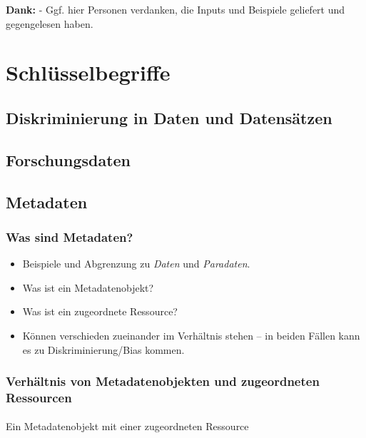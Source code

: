 \documentclass[
  letterpaper,
  DIV=11,
  numbers=noendperiod]{scrartcl}
\makeatletter
\let\oldparagraph\paragraph
\renewcommand{\paragraph}{
    \@ifstar
      \xxxParagraphStar
      \xxxParagraphNoStar
  }
\newcommand{\xxxParagraphStar}[1]{\oldparagraph*{#1}\mbox{}}
\newcommand{\xxxParagraphNoStar}[1]{\oldparagraph{#1}\mbox{}}
\providecommand{\tightlist}{%
  \setlength{\itemsep}{0pt}\setlength{\parskip}{0pt}}\usepackage{longtable,booktabs,array}
\makeatother
\begin{document}
\textbf{Dank:} - Ggf. hier Personen verdanken, die Inputs und Beispiele
geliefert und gegengelesen haben.

\section{Schlüsselbegriffe}\label{schluxfcsselbegriffe}

\subsection{Diskriminierung in Daten und
Datensätzen}\label{diskriminierung-in-daten-und-datensuxe4tzen}

\subsection{Forschungsdaten}\label{forschungsdaten}

\subsection{Metadaten}\label{metadaten}

\subsubsection{Was sind Metadaten?}\label{was-sind-metadaten}

\begin{itemize}
\tightlist
\item
  Beispiele und Abgrenzung zu \emph{Daten} und \emph{Paradaten}.
\item
  Was ist ein Metadatenobjekt?
\item
  Was ist ein zugeordnete Ressource?
\item
  Können verschieden zueinander im Verhältnis stehen -- in beiden Fällen
  kann es zu Diskriminierung/Bias kommen.
\end{itemize}

\subsubsection{Verhältnis von Metadatenobjekten und zugeordneten
Ressourcen}\label{verhuxe4ltnis-von-metadatenobjekten-und-zugeordneten-ressourcen}

\paragraph{Ein Metadatenobjekt mit einer zugeordneten
Ressource}\label{ein-metadatenobjekt-mit-einer-zugeordneten-ressource}
\end{document}
